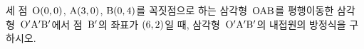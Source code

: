 세 점~$\mathrm{O}(0{,}\mkern3mu\mathopen{}0)$, $\mathrm{A}(3{,}\mkern3mu\mathopen{}0)$, $\mathrm{B}(0{,}\mkern3mu\mathopen{}4)$를 꼭짓점으로 하는 삼각형~$\mathrm{OAB}$를 평행이동한 삼각형~$\mathrm{O'A'B'}$에서 점~$\mathrm{B}'$의 좌표가 $(6{,}\mkern3mu\mathopen{}2)$일 때, 삼각형~$\mathrm{O'A'B'}$의 내접원의 방정식을 구하시오.

